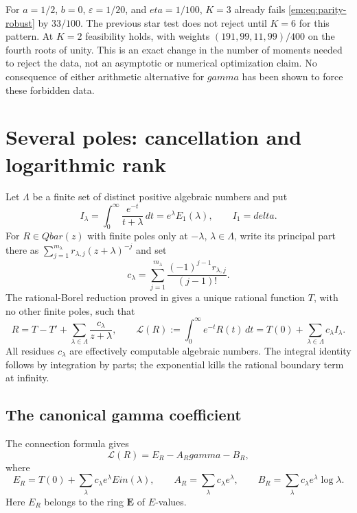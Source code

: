 \documentclass[11pt,a4paper]{article}
\newcommand{\QB}{\overline{\mathbb Q}}
\newcommand{\Qbar}{\overline{\mathbb Q}}
\DeclareMathOperator{\Ein}{Ein}
\theoremstyle{definition}
\theoremstyle{remark}
\theoremstyle{plain}
\numberwithin{equation}{section}
\def\Ein{Ein}\def\gamma{gamma}\def\delta{delta}\def\eta{eta}%
\def\Qbar{Qbar}\def\QB{Qbar}\def\mathbb#1{#1}%
\begin{document}
For $a=1/2$, $b=0$, $\varepsilon=1/20$, and $\eta=1/100$,
$K=3$ already fails \eqref{em:eq:parity-robust} by $33/100$.
The previous star test does not reject until $K=6$ for this pattern.
At $K=2$ feasibility holds, with weights
$(191,99,11,99)/400$ on the fourth roots of unity.
This is an exact change in the number of moments needed to reject
the data, not an asymptotic or numerical optimization claim.
No consequence of either arithmetic alternative for $\gamma$ has
been shown to force these forbidden data.

\section{Several poles: cancellation and logarithmic rank}
\label{em:sec:multipole}

Let $\Lambda$ be a finite set of distinct positive algebraic numbers and put
\[
 I_\lambda=\int_0^\infty\frac{e^{-t}}{t+\lambda}\,dt
          =e^\lambda E_1(\lambda),\qquad I_1=\delta.
\]
For $R\in\Qbar(z)$ with finite poles only at $-\lambda$, $\lambda\in\Lambda$,
write its principal part there as
$\sum_{j=1}^{m_\lambda}r_{\lambda,j}(z+\lambda)^{-j}$ and set
\[
 c_\lambda=\sum_{j=1}^{m_\lambda}
             \frac{(-1)^{j-1}r_{\lambda,j}}{(j-1)!}.
\]
The rational-Borel reduction proved in \cite{Previous} gives a unique
rational function $T$, with no other finite poles, such that
\begin{equation}\label{em:mul:reduction}
 R=T-T'+\sum_{\lambda\in\Lambda}\frac{c_\lambda}{z+\lambda},
 \qquad
 \mathcal L(R):=\int_0^\infty e^{-t}R(t)\,dt
       =T(0)+\sum_{\lambda\in\Lambda}c_\lambda I_\lambda.
\end{equation}
All residues $c_\lambda$ are effectively computable algebraic numbers.
The integral identity follows by integration by parts; the exponential
kills the rational boundary term at infinity.

\subsection{The canonical gamma coefficient}
The connection formula gives
\begin{equation}\label{em:mul:connection}
 \mathcal L(R)=E_R-A_R\gamma-B_R,
\end{equation}
where
\[
 E_R=T(0)+\sum_\lambda c_\lambda e^\lambda\Ein(\lambda),\qquad
 A_R=\sum_\lambda c_\lambda e^\lambda,\qquad
 B_R=\sum_\lambda c_\lambda e^\lambda\log\lambda.
\]
Here $E_R$ belongs to the ring $\mathbf E$ of $E$-values.
\end{document}
